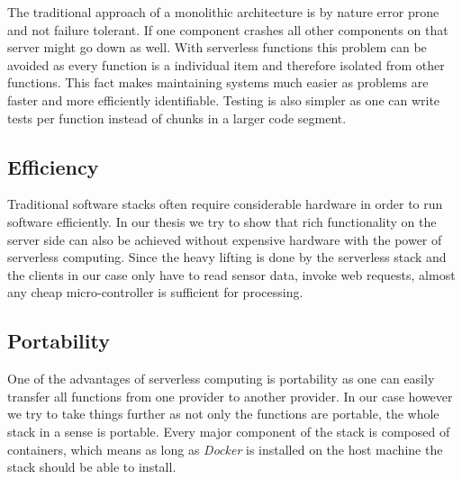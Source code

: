 The traditional approach of a monolithic architecture is by nature error prone and not failure
tolerant. If one component crashes all other components on that server might go down as well. With
serverless functions this problem can be avoided as every function is a individual item and
therefore isolated from other functions. This fact makes maintaining systems much easier as problems
are faster and more efficiently identifiable. Testing is also simpler as one can write tests per
function instead of chunks in a larger code segment.

\subsection{Efficiency}

Traditional software stacks often require considerable hardware in order to run software
efficiently. In our thesis we try to show that rich functionality on the server side can also be
achieved without expensive hardware with the power of serverless computing. Since the heavy lifting
is done by the serverless stack and the clients in our case only have to read sensor data, invoke
web requests, almost any cheap micro-controller is sufficient for processing.

\subsection{Portability}

One of the advantages of serverless computing is portability as one can easily transfer all
functions from one provider to another provider. In our case however we try to take things further as
not only the functions are portable, the whole stack in a sense is portable. Every major component
of the stack is composed of containers, which means as long as \textit{Docker} is installed on the
host machine the stack should be able to install.
